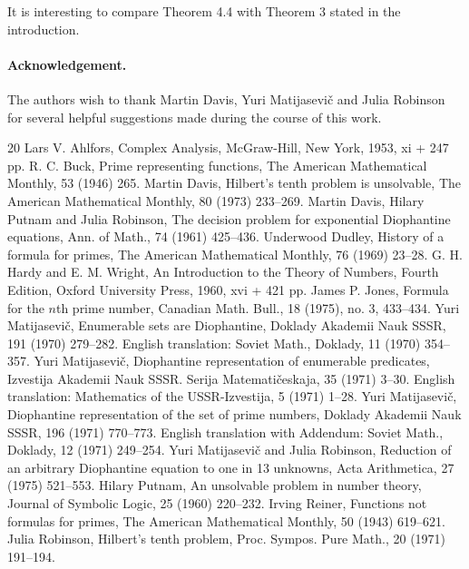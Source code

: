 \documentclass[10pt,letterpaper]{article}
\newcommand{\origpage}[1]{\marginnote{\footnotesize\textbf{[#1]}}}
\begin{document}
\origpage{464}It is interesting to compare Theorem 4.4 with Theorem 3 stated in the introduction.

\paragraph{Acknowledgement.} The authors wish to thank Martin Davis, Yuri Matijasevič and Julia Robinson for several helpful suggestions made during the course of this work.

\begin{thebibliography}{20}
   Lars V. Ahlfors, Complex Analysis, McGraw-Hill, New York, 1953, xi + 247 pp.
   R. C. Buck, Prime representing functions, The American Mathematical Monthly, 53 (1946) 265.
   Martin Davis, Hilbert's tenth problem is unsolvable, The American Mathematical Monthly, 80 (1973) 233--269.
   Martin Davis, Hilary Putnam and Julia Robinson, The decision problem for exponential Diophantine equations, Ann. of Math., 74 (1961) 425--436.
   Underwood Dudley, History of a formula for primes, The American Mathematical Monthly, 76 (1969) 23--28.
   G. H. Hardy and E. M. Wright, An Introduction to the Theory of Numbers, Fourth Edition, Oxford University Press, 1960, xvi + 421 pp.
   James P. Jones, Formula for the $n$th prime number, Canadian Math. Bull., 18 (1975), no. 3, 433--434.
   Yuri Matijasevič, Enumerable sets are Diophantine, Doklady Akademii Nauk SSSR, 191 (1970) 279--282. English translation: Soviet Math., Doklady, 11 (1970) 354--357.
   Yuri Matijasevič, Diophantine representation of enumerable predicates, Izvestija Akademii Nauk SSSR. Serija Matematičeskaja, 35 (1971) 3--30. English translation: Mathematics of the USSR-Izvestija, 5 (1971) 1--28.
   Yuri Matijasevič, Diophantine representation of the set of prime numbers, Doklady Akademii Nauk SSSR, 196 (1971) 770--773. English translation with Addendum: Soviet Math., Doklady, 12 (1971) 249--254.
   Yuri Matijasevič and Julia Robinson, Reduction of an arbitrary Diophantine equation to one in 13 unknowns, Acta Arithmetica, 27 (1975) 521--553.
   Hilary Putnam, An unsolvable problem in number theory, Journal of Symbolic Logic, 25 (1960) 220--232.
   Irving Reiner, Functions not formulas for primes, The American Mathematical Monthly, 50 (1943) 619--621.
   Julia Robinson, Hilbert's tenth problem, Proc. Sympos. Pure Math., 20 (1971) 191--194.

\end{thebibliography}
\end{document}

